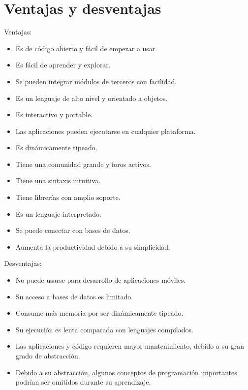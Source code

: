 \documentclass{report}
\begin{document}
\section{Ventajas y desventajas}

Ventajas:

\begin{itemize}
  \item Es de código abierto y fácil de empezar a usar.
  
  \item Es fácil de aprender y explorar.
  
  \item Se pueden integrar módulos de terceros con facilidad.
  
  \item Es un lenguaje de alto nivel y orientado a objetos.
  
  \item Es interactivo y portable.
  
  \item Las aplicaciones pueden ejecutarse en cualquier plataforma.
  
  \item Es dinámicamente tipeado.
  
  \item Tiene una comunidad grande y foros activos.
  
  \item Tiene una sintaxis intuitiva.
  
  \item Tiene librerías con amplio soporte.
  
  \item Es un lenguaje interpretado.
  
  \item Se puede conectar con bases de datos.
  
  \item Aumenta la productividad debido a su simplicidad.
  
\end{itemize}

Desventajas:

\begin{itemize}
  \item No puede usarse para desarrollo de aplicaciones móviles.
  
  \item Su acceso a bases de datos es limitado.
  
  \item Consume más memoria por ser dinámicamente tipeado.
  
  \item Su ejecución es lenta comparada con lenguajes compilados.
  
  \item Las aplicaciones y código requieren mayor mantenimiento, debido a su gran grado de abstracción.

  \item Debido a su abstracción, algunos conceptos de programación importantes podrían ser omitidos durante su aprendizaje.

\end{itemize}
\end{document}
